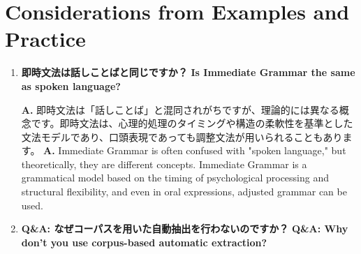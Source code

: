   \section{Considerations from Examples and Practice}
\fi

\begin{enumerate}[resume, label=\textbf{Q\arabic*.}, leftmargin=2em]

  \item \label{qa:20250406a}
\ifJPN
  \textbf{即時文法は話しことばと同じですか？}
\else
  \textbf{Is Immediate Grammar the same as spoken language?}
\fi

\ifJPN
  \textbf{A.} 即時文法は「話しことば」と混同されがちですが、理論的には異なる概念です。即時文法は、心理的処理のタイミングや構造の柔軟性を基準とした文法モデルであり、口頭表現であっても調整文法が用いられることもあります。
\lse
  \textbf{A.} Immediate Grammar is often confused with "spoken language," but theoretically, they are different concepts. Immediate Grammar is a grammatical model based on the timing of psychological processing and structural flexibility, and even in oral expressions, adjusted grammar can be used.
\fi

  \item \label{qa:20250406b}
\ifJPN
  \textbf{Q\&A: なぜコーパスを用いた自動抽出を行わないのですか？}
\else
  \textbf{Q\&A: Why don't you use corpus-based automatic extraction?}
\fi


\end{enumerate}
